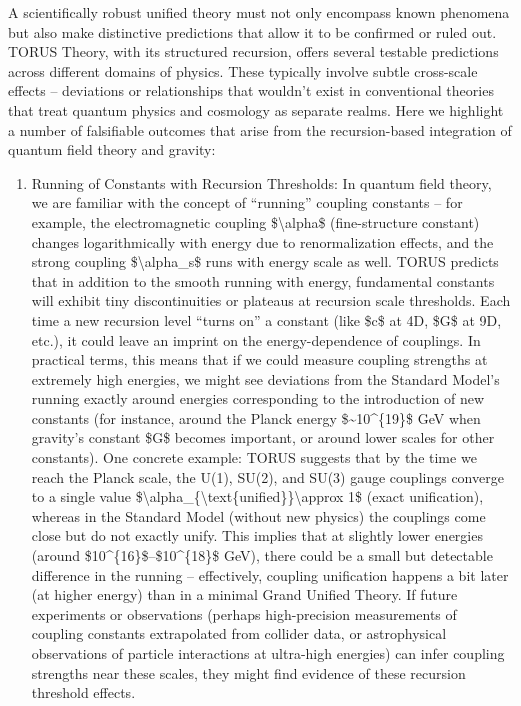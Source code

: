 \documentclass[
]{article}
\begin{document}
A scientifically robust unified theory must not only encompass known
phenomena but also make distinctive predictions that allow it to be
confirmed or ruled out. TORUS Theory, with its structured recursion,
offers several testable predictions across different domains of physics.
These typically involve subtle cross-scale effects -- deviations or
relationships that wouldn't exist in conventional theories that treat
quantum physics and cosmology as separate realms. Here we highlight a
number of falsifiable outcomes that arise from the recursion-based
integration of quantum field theory and gravity:

\begin{enumerate}
\def\labelenumi{\arabic{enumi}.}
\item
  Running of Constants with Recursion Thresholds: In quantum field
  theory, we are familiar with the concept of ``running'' coupling
  constants -- for example, the electromagnetic coupling
  \$\textbackslash alpha\$ (fine-structure constant) changes
  logarithmically with energy due to renormalization effects, and the
  strong coupling \$\textbackslash alpha\_s\$ runs with energy scale as
  well. TORUS predicts that in addition to the smooth running with
  energy, fundamental constants will exhibit tiny discontinuities or
  plateaus at recursion scale thresholds. Each time a new recursion
  level ``turns on'' a constant (like \$c\$ at 4D, \$G\$ at 9D, etc.),
  it could leave an imprint on the energy-dependence of couplings. In
  practical terms, this means that if we could measure coupling
  strengths at extremely high energies, we might see deviations from the
  Standard Model's running exactly around energies corresponding to the
  introduction of new constants (for instance, around the Planck energy
  \$\textasciitilde10\^{}\{19\}\$ GeV when gravity's constant \$G\$
  becomes important, or around lower scales for other constants). One
  concrete example: TORUS suggests that by the time we reach the Planck
  scale, the U(1), SU(2), and SU(3) gauge couplings converge to a single
  value
  \$\textbackslash alpha\_\{\textbackslash text\{unified\}\}\textbackslash approx
  1\$ (exact unification), whereas in the Standard Model (without new
  physics) the couplings come close but do not exactly unify. This
  implies that at slightly lower energies (around
  \$10\^{}\{16\}\$--\$10\^{}\{18\}\$ GeV), there could be a small but
  detectable difference in the running -- effectively, coupling
  unification happens a bit later (at higher energy) than in a minimal
  Grand Unified Theory. If future experiments or observations (perhaps
  high-precision measurements of coupling constants extrapolated from
  collider data, or astrophysical observations of particle interactions
  at ultra-high energies) can infer coupling strengths near these
  scales, they might find evidence of these recursion threshold effects.
\end{enumerate}
\end{document}
